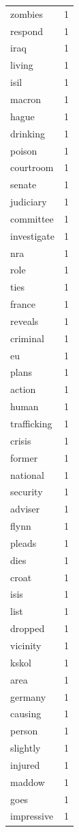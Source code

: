\begin{tabular}{lr}
zombies & 1 \\
respond & 1 \\
iraq & 1 \\
living & 1 \\
isil & 1 \\
macron & 1 \\
hague & 1 \\
drinking & 1 \\
poison & 1 \\
courtroom & 1 \\
senate & 1 \\
judiciary & 1 \\
committee & 1 \\
investigate & 1 \\
nra & 1 \\
role & 1 \\
ties & 1 \\
france & 1 \\
reveals & 1 \\
criminal & 1 \\
eu & 1 \\
plans & 1 \\
action & 1 \\
human & 1 \\
trafficking & 1 \\
crisis & 1 \\
former & 1 \\
national & 1 \\
security & 1 \\
adviser & 1 \\
flynn & 1 \\
pleads & 1 \\
dies & 1 \\
croat & 1 \\
isis & 1 \\
list & 1 \\
dropped & 1 \\
vicinity & 1 \\
kskol & 1 \\
area & 1 \\
germany & 1 \\
causing & 1 \\
person & 1 \\
slightly & 1 \\
injured & 1 \\
maddow & 1 \\
goes & 1 \\
impressive & 1 \\

\end{tabular}
